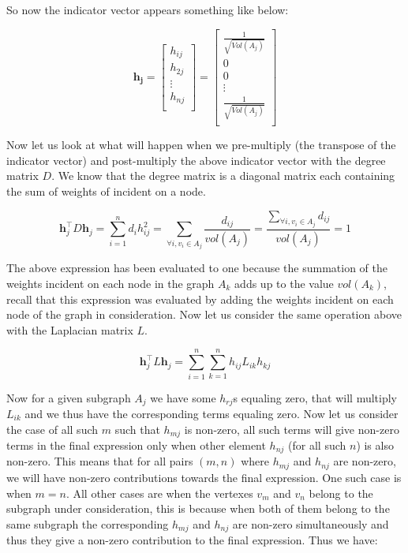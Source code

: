 \documentclass[english]{article}
\theoremstyle{plain}
\begin{document}
So now the indicator vector appears something like below:

\begin{equation}
\boldsymbol{h_{j}} = 
\begin{bmatrix}
h_{ij}\\
h_{2j}\\
\vdots\\
h_{nj}\\
\end{bmatrix} = 
\begin{bmatrix}
\frac{1}{\sqrt{Vol(A_{j})}} \\
0 \\
0 \\
\vdots \\
\frac{1}{\sqrt{Vol(A_{j})}} \\
\end{bmatrix}
\end{equation}

Now let us look at what will happen when we pre-multiply (the transpose of the indicator vector) and post-multiply the above indicator vector with the degree matrix $D$. We know that the degree matrix is a diagonal matrix each containing the sum of weights of incident on a node. 

\begin{equation}
\boldsymbol{h}_{j}^{\top}D\boldsymbol{h}_{j} = \sum_{i=1}^{n} d_{i}h^{2}_{ij} = \sum_{\forall i,v_{i} \in A_{j}} \frac{d_{ij}}{vol(A_{j})} = \frac{\sum_{\forall i,v_{i} \in A_{j}}d_{ij}}{vol(A_{j})}  = 1
\end{equation}

The above expression has been evaluated to one because the summation of the weights incident on each node in the graph $A_{k}$ adds up to the value $vol(A_{k})$, recall that this expression was evaluated by adding the weights incident on each node of the graph in consideration. Now let us consider the same operation above with the Laplacian matrix $L$.

\begin{equation}
\boldsymbol{h}_{j}^{\top}L\boldsymbol{h}_{j} = \sum_{i=1}^{n}\sum_{k=1}^{n} h_{ij}L_{ik}h_{kj}
\end{equation}

Now for a given subgraph $A_{j}$ we have some $h_{rj}$s equaling zero, that will multiply $L_{ik}$ and we thus have the corresponding terms equaling zero. Now let us consider the case of all such $m$ such that $h_{mj}$ is non-zero, all such terms will give non-zero terms in the final expression only when other element $h_{nj}$ (for all such $n$) is also non-zero. This means that for all pairs $(m,n)$ where $h_{mj}$ and $h_{nj}$ are non-zero, we will have non-zero contributions towards the final expression. One such case is when $m=n$. All other cases are when the vertexes $v_{m}$ and $v_{n}$ belong to the subgraph under consideration, this is because when both of them belong to the same subgraph the corresponding $h_{mj}$ and $h_{nj}$ are non-zero simultaneously and thus they give a non-zero contribution to the final expression. Thus we have:
\end{document}
